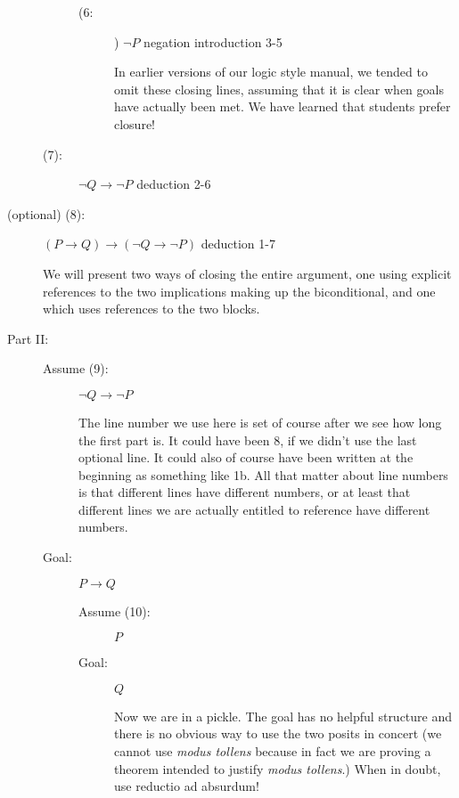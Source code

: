 \documentclass[12pt]{book}
\begin{document}
\begin{description}
\begin{description}
\begin{description}
\begin{description}
\end{description}

\item[ (6:] ) $\neg P$ negation introduction 3-5

In earlier versions of our logic style manual, we tended to omit these closing lines, assuming that it is clear when
goals have actually been met.  We have learned that students prefer closure!

\end{description}

\item [(7):] $\neg Q \rightarrow \neg P$  deduction 2-6

\end{description}

\item[(optional) (8):]  $(P \rightarrow Q) \rightarrow (\neg Q \rightarrow \neg P)$ deduction 1-7

We will present two ways of closing the entire argument, one using explicit references to the two implications
making up the biconditional, and one which uses references to the two blocks.

\newpage


\item[Part II:]

\begin{description}

\item[Assume (9):] $\neg Q \rightarrow \neg P$

The line number we use here is set of course after we see how long the first part is.  It could have been 8,
if we didn't use the last optional line.  It could also of course have been written at the beginning as something like
1b.  All that matter about line numbers is that different lines have different numbers, or at least that different lines
we are actually entitled to reference have different numbers.

\item[Goal:]  $P \rightarrow Q$

\begin{description}

\item[Assume (10):]  $P$

\item[Goal:]  $Q$

Now we are in a pickle.  The goal has no helpful structure and there is no obvious way to use the two posits in concert
(we cannot use {\em modus tollens\/} because in fact we are proving a theorem intended to justify {\em modus tollens\/}.)  When in doubt, use reductio ad absurdum!


\end{description}
\end{description}
\end{description}
\end{document}
